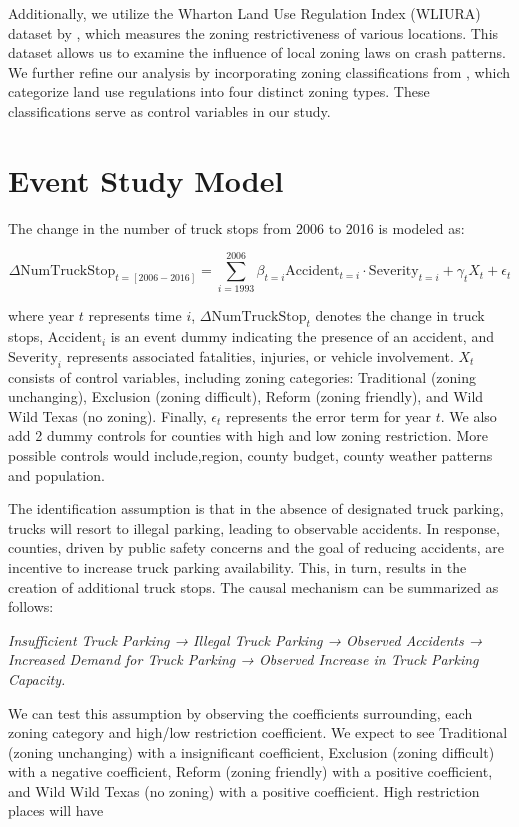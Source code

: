 \documentclass[
  8pt,
  12pt]{article}
\begin{document}
Additionally, we utilize the Wharton Land Use Regulation Index (WLIURA)
dataset by \citet{gyourkoNewMeasureLocal2008}, which measures the zoning
restrictiveness of various locations. This dataset allows us to examine
the influence of local zoning laws on crash patterns. We further refine
our analysis by incorporating zoning classifications from
\citet{puentesTraditionalReformedReview2006}, which categorize land use
regulations into four distinct zoning types. These classifications serve
as control variables in our study.

\section{Event Study Model}\label{event-study-model}

The change in the number of truck stops from 2006 to 2016 is modeled as:

\[
\Delta \text{NumTruckStop}_{t=[2006-2016]} = 
\sum_{i=1993}^{2006} \beta_{t=i} \text{Accident}_{t=i}\cdot \text{Severity}_{t=i} + \gamma_{t} X_{t} + \epsilon_{t}
\]

where year \(t\) represents time \(i\),
\(\Delta\text{NumTruckStop}_{t}\) denotes the change in truck stops,
\(\text{Accident}_{i}\) is an event dummy indicating the presence of an
accident, and \(\text{Severity}_{i}\) represents associated fatalities,
injuries, or vehicle involvement. \(X_{t}\) consists of control
variables, including zoning categories: Traditional (zoning unchanging),
Exclusion (zoning difficult), Reform (zoning friendly), and Wild Wild
Texas (no zoning). Finally, \(\epsilon_{t}\) represents the error term
for year \(t\). We also add 2 dummy controls for counties with high and
low zoning restriction. More possible controls would include,region,
county budget, county weather patterns and population.

The identification assumption is that in the absence of designated truck
parking, trucks will resort to illegal parking, leading to observable
accidents. In response, counties, driven by public safety concerns and
the goal of reducing accidents, are incentive to increase truck parking
availability. This, in turn, results in the creation of additional truck
stops. The causal mechanism can be summarized as follows:

\emph{Insufficient Truck Parking → Illegal Truck Parking → Observed
Accidents → Increased Demand for Truck Parking → Observed Increase in
Truck Parking Capacity.}

We can test this assumption by observing the coefficients surrounding,
each zoning category and high/low restriction coefficient. We expect to
see Traditional (zoning unchanging) with a insignificant coefficient,
Exclusion (zoning difficult) with a negative coefficient, Reform (zoning
friendly) with a positive coefficient, and Wild Wild Texas (no zoning)
with a positive coefficient. High restriction places will have
\end{document}
